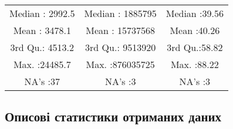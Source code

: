 \documentclass[
]{article}
\begin{document}
\begin{longtable}[]{@{}ccc@{}}
\begin{minipage}[t]{0.36\columnwidth}
Median : 2992.5\strut
\end{minipage} & \begin{minipage}[t]{0.21\columnwidth}\centering
Median : 1885795\strut
\end{minipage} & \begin{minipage}[t]{0.35\columnwidth}\centering
Median :39.56\strut
\end{minipage}\tabularnewline
\begin{minipage}[t]{0.36\columnwidth}\centering
Mean : 3478.1\strut
\end{minipage} & \begin{minipage}[t]{0.21\columnwidth}\centering
Mean : 15737568\strut
\end{minipage} & \begin{minipage}[t]{0.35\columnwidth}\centering
Mean :40.26\strut
\end{minipage}\tabularnewline
\begin{minipage}[t]{0.36\columnwidth}\centering
3rd Qu.: 4513.2\strut
\end{minipage} & \begin{minipage}[t]{0.21\columnwidth}\centering
3rd Qu.: 9513920\strut
\end{minipage} & \begin{minipage}[t]{0.35\columnwidth}\centering
3rd Qu.:58.82\strut
\end{minipage}\tabularnewline
\begin{minipage}[t]{0.36\columnwidth}\centering
Max. :24485.7\strut
\end{minipage} & \begin{minipage}[t]{0.21\columnwidth}\centering
Max. :876035725\strut
\end{minipage} & \begin{minipage}[t]{0.35\columnwidth}\centering
Max. :88.22\strut
\end{minipage}\tabularnewline
\begin{minipage}[t]{0.36\columnwidth}\centering
NA's :37\strut
\end{minipage} & \begin{minipage}[t]{0.21\columnwidth}\centering
NA's :3\strut
\end{minipage} & \begin{minipage}[t]{0.35\columnwidth}\centering
NA's :3\strut
\end{minipage}\tabularnewline
\bottomrule
\end{longtable}

\hypertarget{ux43eux43fux438ux441ux43eux432ux456-ux441ux442ux430ux442ux438ux441ux442ux438ux43aux438-ux43eux442ux440ux438ux43cux430ux43dux438ux445-ux434ux430ux43dux438ux445}{%
\subsection{Описові статистики отриманих
даних}\label{ux43eux43fux438ux441ux43eux432ux456-ux441ux442ux430ux442ux438ux441ux442ux438ux43aux438-ux43eux442ux440ux438ux43cux430ux43dux438ux445-ux434ux430ux43dux438ux445}}
\end{document}
